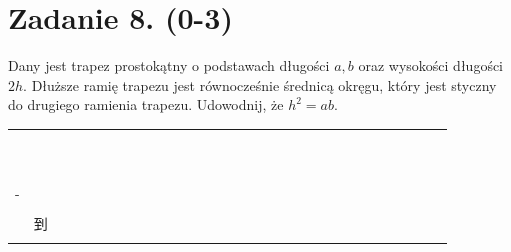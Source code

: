 \documentclass[10pt]{article}
\begin{document}
\section*{Zadanie 8. (0-3)}
Dany jest trapez prostokątny o podstawach długości \(a, b\) oraz wysokości długości \(2 h\). Dłuższe ramię trapezu jest równocześnie średnicą okręgu, który jest styczny do drugiego ramienia trapezu. Udowodnij, że \(h^{2}=a b\).

\begin{center}
\begin{tabular}{|c|c|c|c|c|c|c|c|c|c|c|c|c|c|c|c|c|c|c|c|c|c|c|c|c|c|c|c|c|c|}
\hline
 &  &  &  &  &  &  &  &  &  &  &  &  &  &  &  &  &  &  &  &  &  &  &  &  &  &  &  &  &  \\
\hline
 &  &  &  &  &  &  &  &  &  &  &  &  &  &  &  &  &  &  &  &  &  &  &  &  &  &  &  &  &  \\
\hline
 &  &  &  &  &  &  &  &  &  &  &  &  &  &  &  &  &  &  &  &  &  &  &  &  &  &  &  &  &  \\
\hline
 &  &  &  &  &  &  &  &  &  &  &  &  &  &  &  &  &  &  &  &  &  &  &  &  &  &  &  &  &  \\
\hline
 &  &  &  &  &  &  &  &  &  &  &  &  &  &  &  &  &  &  &  &  &  &  &  &  &  &  &  &  &  \\
\hline
 &  &  &  &  &  &  &  &  &  &  &  &  &  &  &  &  &  &  &  &  &  &  &  &  &  &  &  &  &  \\
\hline
 &  &  &  &  &  &  &  &  &  &  &  &  &  &  &  &  &  &  &  &  &  &  &  &  &  &  &  &  &  \\
\hline
 &  &  &  &  &  &  &  &  &  &  &  &  &  &  &  &  &  &  &  &  &  &  &  &  &  &  &  &  &  \\
\hline
 &  &  &  &  &  &  &  &  &  &  &  &  &  &  &  &  &  &  &  &  &  &  &  &  &  &  &  &  &  \\
\hline
 &  &  &  &  &  &  &  &  &  &  &  &  &  &  &  &  &  &  &  &  &  &  &  &  &  &  &  &  &  \\
\hline
 &  &  &  &  &  &  &  &  &  &  &  &  &  &  &  &  &  &  &  &  &  &  &  &  &  &  &  &  &  \\
\hline
- &  &  &  &  &  &  &  &  &  &  &  &  &  &  &  &  &  &  &  &  &  &  &  &  &  &  &  &  &  \\
\hline
 &  &  &  &  &  &  &  &  &  &  &  &  &  &  &  &  &  &  &  &  &  &  &  &  &  &  &  &  &  \\
\hline
 & 到 &  &  &  &  &  &  &  &  &  &  &  &  &  &  &  &  &  &  &  &  &  &  &  &  &  &  &  &  \\
\hline
 &  &  &  &  &  &  &  &  &  &  &  &  &  &  &  &  &  &  &  &  &  &  &  &  &  &  &  &  &  \\

\end{tabular}
\end{center}
\end{document}
